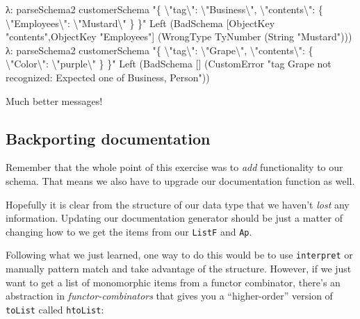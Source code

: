 \documentclass[]{article}
\newenvironment{Shaded}{}{}
\newcommand{\DataTypeTok}[1]{\textcolor[rgb]{0.56,0.13,0.00}{#1}}
\newcommand{\NormalTok}[1]{#1}
\newcommand{\OperatorTok}[1]{\textcolor[rgb]{0.40,0.40,0.40}{#1}}
\newcommand{\StringTok}[1]{\textcolor[rgb]{0.25,0.44,0.63}{#1}}
\begin{document}
\begin{Shaded}
\begin{Highlighting}[]
\NormalTok{λ}\OperatorTok{:}\NormalTok{ parseSchema2 customerSchema  }\StringTok{"\{ \textbackslash{}"tag\textbackslash{}": \textbackslash{}"Business\textbackslash{}", \textbackslash{}"contents\textbackslash{}": \{ \textbackslash{}"Employees\textbackslash{}": \textbackslash{}"Mustard\textbackslash{}" \} \}"}
\DataTypeTok{Left}\NormalTok{ (}\DataTypeTok{BadSchema}\NormalTok{ [}\DataTypeTok{ObjectKey} \StringTok{"contents"}\NormalTok{,}\DataTypeTok{ObjectKey} \StringTok{"Employees"}\NormalTok{] (}\DataTypeTok{WrongType} \DataTypeTok{TyNumber}\NormalTok{ (}\DataTypeTok{String} \StringTok{"Mustard"}\NormalTok{)))}
\NormalTok{λ}\OperatorTok{:}\NormalTok{ parseSchema2 customerSchema  }\StringTok{"\{ \textbackslash{}"tag\textbackslash{}": \textbackslash{}"Grape\textbackslash{}", \textbackslash{}"contents\textbackslash{}": \{ \textbackslash{}"Color\textbackslash{}": \textbackslash{}"purple\textbackslash{}" \} \}"}
\DataTypeTok{Left}\NormalTok{ (}\DataTypeTok{BadSchema}\NormalTok{ [] (}\DataTypeTok{CustomError} \StringTok{"tag Grape not recognized: Expected one of Business, Person"}\NormalTok{))}
\end{Highlighting}
\end{Shaded}

Much better messages!

\subsection{Backporting documentation}\label{backporting-documentation}

Remember that the whole point of this exercise was to \emph{add} functionality
to our schema. That means we also have to upgrade our documentation function as
well.

Hopefully it is clear from the structure of our data type that we haven't
\emph{lost} any information. Updating our documentation generator should be just
a matter of changing how to we get the items from our \texttt{ListF} and
\texttt{Ap}.

Following what we just learned, one way to do this would be to use
\texttt{interpret} or manually pattern match and take advantage of the
structure. However, if we just want to get a list of monomorphic items from a
functor combinator, there's an abstraction in \emph{functor-combinators} that
gives you a ``higher-order'' version of \texttt{toList} called \texttt{htoList}:
\end{document}
